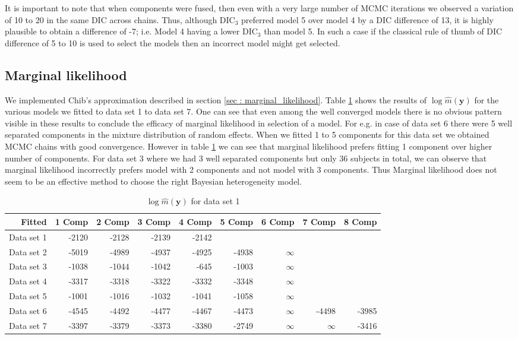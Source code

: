 It is important to note that when components were fused, then even with a very large number of MCMC iterations we observed a variation of 10 to 20 in the same DIC across chains. Thus, although $\text{DIC}_3$ preferred model 5 over model 4 by a DIC difference of 13, it is highly plausible to obtain a difference of -7; i.e. Model 4 having a lower $\text{DIC}_3$ than model 5. In such a case if the classical rule of thumb of DIC difference of 5 to 10 is used to select the models then an incorrect model might get selected.

\subsection{Marginal likelihood}
\label{subsec : marginal_likelihood_simulation}
We implemented Chib's approximation described in section \ref{sec : marginal_likelihood}. Table \ref{table : marginal_likelihood_results} shows the results of $\log{\hat{m}(\boldsymbol{y})}$ for the various models we fitted to data set 1 to data set 7. One can see that even among the well converged models there is no obvious pattern visible in these results to conclude the efficacy of marginal likelihood in selection of a model. For e.g. in case of data set 6 there were 5 well separated components in the mixture distribution of random effects. When we fitted 1 to 5 components for this data set we obtained MCMC chains with good convergence. However in table \ref{table : marginal_likelihood_results} we can see that marginal likelihood prefers fitting 1 component over higher number of components. For data set 3 where we had 3 well separated components but only 36 subjects in total, we can observe that marginal likelihood incorrectly prefers model with 2 components and not model with 3 components. Thus Marginal likelihood does not seem to be an effective method to choose the right Bayesian heterogeneity model.

\begin{table}[!htb]
\centering
\captionsetup{justification=centering}
\caption{$\log{\hat{m}(\boldsymbol{y})}$ for data set 1}
\label{table : marginal_likelihood_results} 
\begin{tabular}{rrrrrrrrr}
\toprule
Fitted & 1 Comp & 2 Comp & 3 Comp & 4 Comp & 5 Comp & 6 Comp & 7 Comp & 8 Comp \\\midrule
Data set 1 & -2120 & -2128 & -2139 & -2142 &  &  &  &  \\
Data set 2 & -5019 & -4989 & -4937 & -4925 & -4938 & $\infty$ &  &  \\
Data set 3 & -1038 & -1044 & -1042 & -645 & -1003 & $\infty$ &  &  \\
Data set 4 & -3317 & -3318 & -3322 & -3332 & -3348 & $\infty$ &  &  \\
Data set 5 & -1001 & -1016 & -1032 & -1041 & -1058 & $\infty$ &  &  \\
Data set 6 & -4545 & -4492 & -4477 & -4467 & -4473 & $\infty$ & -4498 & -3985 \\
Data set 7 & -3397 & -3379 & -3373 & -3380 & -2749 & $\infty$ & $\infty$ & -3416 \\ \bottomrule
\end{tabular}
\end{table}


